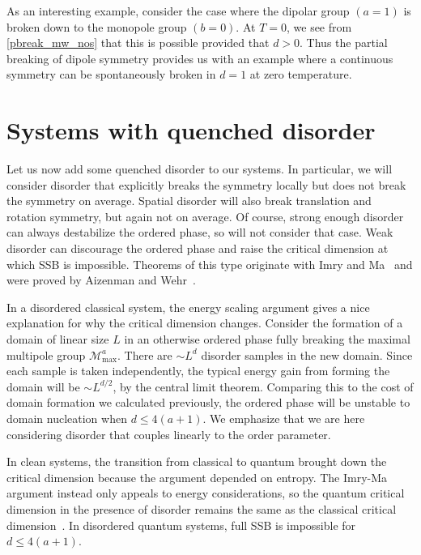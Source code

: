 \documentclass[prb,aps,twocolumn, amsfonts,amsmath,amssymb,nofootinbib,superscriptaddress]{revtex4-2}
\renewcommand{\max}{\text{max}}
\begin{document}
As an interesting example, consider the case where the dipolar group $(a=1)$ is broken down to the monopole group $(b=0)$. At $T=0$, we see from \eqref{pbreak_mw_nos} that this is possible provided that $d>0$. Thus the partial breaking of dipole symmetry provides us with an example where a continuous symmetry can be spontaneously broken in $d=1$ at zero temperature. 

\section{Systems with quenched disorder} \label{sec:disord}

Let us now add some quenched disorder to our systems. In particular, we will consider disorder that explicitly breaks the symmetry locally but does not break the symmetry on average. Spatial disorder will also break translation and rotation symmetry, but again not on average. Of course, strong enough disorder can always destabilize the ordered phase, so will not consider that case. Weak disorder can discourage the ordered phase and raise the critical dimension at which SSB is impossible. Theorems of this type originate with Imry and Ma~\cite{ImryMa} and were proved by Aizenman and Wehr~\cite{Aizenman}.

In a disordered classical system, the energy scaling argument gives a nice explanation for why the critical dimension changes. Consider the formation of a domain of linear size $L$ in an otherwise ordered phase fully breaking the maximal multipole group $\mathcal{M}^a_\max$. There are $\sim L^d$ disorder samples in the new domain. Since each sample is taken independently, the typical energy gain from forming the domain will be $\sim L^{d/2}$, by the central limit theorem. Comparing this to the cost of domain formation we calculated previously, the ordered phase will be unstable to domain nucleation when $d\le 4(a+1)$. We emphasize that we are here considering disorder that couples linearly to the order parameter. 

In clean systems, the transition from classical to quantum brought down the critical dimension because the argument depended on entropy. The Imry-Ma argument instead only appeals to energy considerations, so the quantum critical dimension in the presence of disorder remains the same as the classical critical dimension~\cite{Vojta2013}. In disordered quantum systems, full SSB is impossible for $d\le 4(a+1)$.
\end{document}
